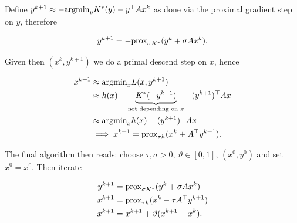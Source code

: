Define $y^{k+1} \approx -\mathrm{argmin}_y K^*(y) - y^\top A x^k$ as done via the proximal gradient step on $y$, therefore 

\[ y^{k+1} = -\mathrm{prox}_{\sigma K^*} (y^k + \sigma A x^k). \]

Given then $(x^k,y^{k+1})$ we do a primal descend step on $x$, hence 

\begin{align}
    x^{k+1} &\approx \mathrm{argmin}_x L(x,y^{k+1}) \\
        &\approx h(x) - \underbrace{K^*(-y^{k+1})}_{\text{not depending on } x} - (y^{k+1})^\top A x \\
        &\approx \mathrm{argmin}_x h(x) - (y^{k+1})^\top A x \\
        &\implies x^{k+1} = \mathrm{prox}_{\tau h} (x^k + A^\top y^{k+1}).
\end{align}

The final algorithm then reads: choose $\tau, \sigma > 0$, $\vartheta \in [0,1]$, $(x^0,y^0)$ and set $\bar{x}^0 = x^0$. Then iterate 

\begin{align*}
    y^{k+1} &= \mathrm{prox}_{\sigma K^*} (y^k + \sigma A \bar{x}^k) \\
    x^{k+1} &= \mathrm{prox}_{\tau h} (x^k - \tau A^\top y^{k+1}) \\
    \bar{x}^{k+1} &= x^{k+1} + \vartheta (x^{k+1} - x^{k}).
\end{align*}